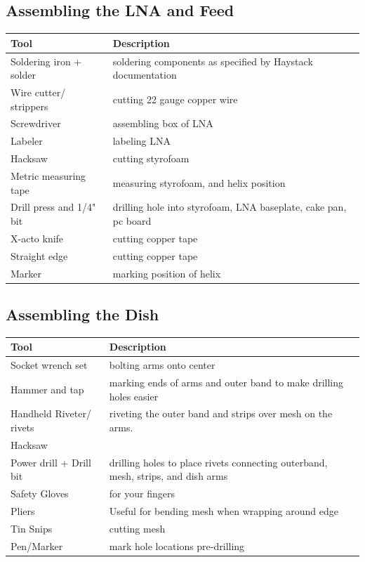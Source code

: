 \documentclass[11pt]{article} %
\begin{document}
\subsection{Assembling the LNA and Feed}

\begin{tabular}{| l | p{10cm} |}
\hline
\textbf{Tool} & \textbf{Description} \\ \hline \hline
Soldering iron + solder & soldering components as specified by Haystack documentation \\ \hline
Wire cutter/ strippers & cutting 22 gauge copper wire\\ \hline
Screwdriver & assembling box of LNA\\ \hline
Labeler & labeling LNA\\ \hline
Hacksaw & cutting styrofoam\\ \hline
Metric measuring tape & measuring styrofoam, and helix position\\ \hline
Drill press and 1/4" bit & drilling hole into styrofoam, LNA baseplate, cake pan, pc board\\ \hline
X-acto knife & cutting copper tape\\ \hline
Straight edge & cutting copper tape\\ \hline
Marker & marking position of helix\\ \hline
\end{tabular}


\subsection{Assembling the Dish}

\begin{tabular}{| l | p{10cm} |}
\hline
\textbf{Tool} & \textbf{Description} \\ \hline \hline
Socket wrench set & bolting arms onto center\\ \hline
Hammer and tap & marking ends of arms and outer band to make drilling holes easier\\ \hline
Handheld Riveter/ rivets & riveting the outer band and strips over mesh on the arms.\\ \hline
Hacksaw & \\ \hline
Power drill + Drill bit & drilling holes to place rivets connecting outerband, mesh, strips, and dish arms\\ \hline
Safety Gloves & for your fingers\\ \hline
Pliers & Useful for bending mesh when wrapping around edge\\ \hline
Tin Snips & cutting mesh\\ \hline
Pen/Marker & mark hole locations pre-drilling\\ \hline
\end{tabular}
\end{document}
